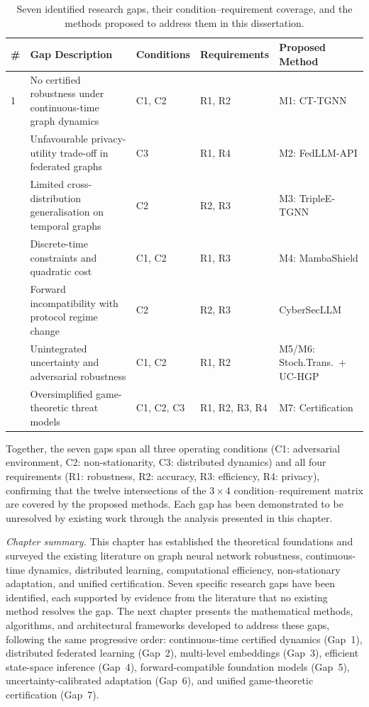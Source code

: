 \begin{table}[htbp]
\centering
\caption{Seven identified research gaps, their condition--requirement coverage, and the methods proposed to address them in this dissertation.}
\label{tab:gaps}
\small
\begin{tabular}{p{0.5cm} p{5.5cm} p{2.5cm} p{2.0cm} p{2.5cm}}
\toprule
\textbf{\#} & \textbf{Gap Description} & \textbf{Conditions} & \textbf{Require\-ments} & \textbf{Proposed Method} \\
\midrule
1 & No certified robustness under continuous-time graph dynamics & C1, C2 & R1, R2 & M1: CT-TGNN \\
\addlinespace
2 & Unfavourable privacy-utility trade-off in federated graphs & C3 & R1, R4 & M2: FedLLM-API \\
\addlinespace
3 & Limited cross-distribution generalisation on temporal graphs & C2 & R2, R3 & M3: TripleE-TGNN \\
\addlinespace
4 & Discrete-time constraints and quadratic cost & C1, C2 & R1, R3 & M4: MambaShield \\
\addlinespace
5 & Forward incompatibility with protocol regime change & C2 & R2, R3 & CyberSecLLM \\
\addlinespace
6 & Unintegrated uncertainty and adversarial robustness & C1, C2 & R1, R2 & M5/M6: Stoch.Trans.\ + UC-HGP \\
\addlinespace
7 & Oversimplified game-theoretic threat models & C1, C2, C3 & R1, R2, R3, R4 & M7: Certification \\
\bottomrule
\end{tabular}
\end{table}

Together, the seven gaps span all three operating conditions (C1: adversarial environment, C2: non-stationarity, C3: distributed dynamics) and all four requirements (R1: robustness, R2: accuracy, R3: efficiency, R4: privacy), confirming that the twelve intersections of the $3\times4$ condition--requirement matrix are covered by the proposed methods. Each gap has been demonstrated to be unresolved by existing work through the analysis presented in this chapter.

\medskip
\noindent\textit{Chapter summary.} This chapter has established the theoretical foundations and surveyed the existing literature on graph neural network robustness, continuous-time dynamics, distributed learning, computational efficiency, non-stationary adaptation, and unified certification. Seven specific research gaps have been identified, each supported by evidence from the literature that no existing method resolves the gap. The next chapter presents the mathematical methods, algorithms, and architectural frameworks developed to address these gaps, following the same progressive order: continuous-time certified dynamics (Gap~1), distributed federated learning (Gap~2), multi-level embeddings (Gap~3), efficient state-space inference (Gap~4), forward-compatible foundation models (Gap~5), uncertainty-calibrated adaptation (Gap~6), and unified game-theoretic certification (Gap~7).

